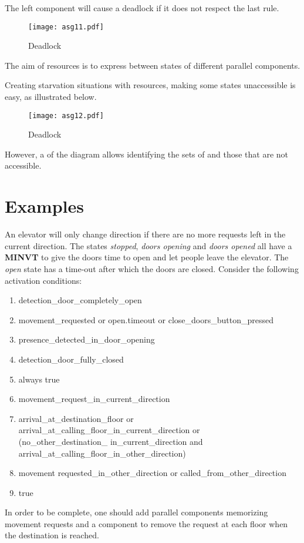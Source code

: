 \documentclass[../main.tex]{subfiles}
\begin{document}
\begin{exmp}
The left component will cause a deadlock if it does not respect the last rule.
\begin{figure}[H]
    \centering
    \texttt{[image: asg11.pdf]}
    \caption{Deadlock}
    \label{asg11}
\end{figure}
\end{exmp}
The aim of resources is to express  between states of different parallel components.
\begin{exmp}
Creating starvation situations with resources, making some states unaccessible is easy, as illustrated below.
\begin{figure}[H]
    \centering
    \texttt{[image: asg12.pdf]}
    \caption{Deadlock}
    \label{asg12}
\end{figure}
However, a  of the diagram allows identifying the sets of  and those that are not accessible.
\end{exmp}

\section{Examples}
\begin{exmp}
An elevator will only change direction if there are no more requests left in the current direction. The states \textit{stopped}, \textit{doors opening} and \textit{doors opened} all have a \textbf{MINVT} to give the doors time to open and let people leave the elevator. The \textit{open} state has a time-out after which the doors are closed. Consider the following activation conditions:
\begin{enumerate}
	\item detection\_door\_completely\_open
	\item movement\_requested or open.timeout or close\_doors\_button\_pressed
	\item presence\_detected\_in\_door\_opening
	\item detection\_door\_fully\_closed
	\item always true
	\item movement\_request\_in\_current\_direction
	\item arrival\_at\_destination\_floor or arrival\_at\_calling\_floor\_in\_current\_direction or \\ (no\_other\_destination\_ in\_current\_direction and arrival\_at\_calling\_floor\_in\_other\_direction)
	\item movement requested\_in\_other\_direction or called\_from\_other\_direction
	\item true
\end{enumerate}
In order to be complete, one should add parallel components memorizing movement requests and a component to remove the request at each floor when the destination is reached.
\end{exmp}
\end{document}
